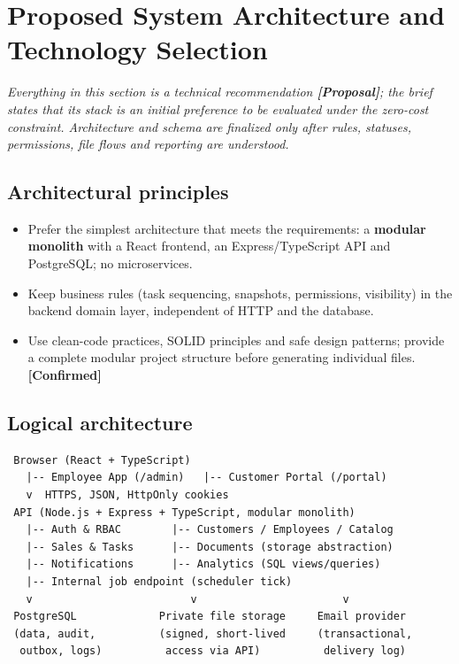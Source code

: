 \documentclass[11pt,a4paper]{article}
\newcommand{\tagconf}{\textcolor{green!45!black}{\textbf{[Confirmed]}}}
\newcommand{\tagprop}{\textcolor{orange!80!black}{\textbf{[Proposal]}}}
\begin{document}
\section{Proposed System Architecture and Technology Selection}

\emph{Everything in this section is a technical recommendation \tagprop{}; the
	brief states that its stack is an initial preference to be evaluated under the
	zero-cost constraint. Architecture and schema are finalized only after rules,
	statuses, permissions, file flows and reporting are understood.}

\subsection{Architectural principles}

\begin{itemize}
	\item Prefer the simplest architecture that meets the requirements: a
	      \textbf{modular monolith} with a React frontend, an Express/TypeScript API and
	      PostgreSQL; no microservices.
	\item Keep business rules (task sequencing, snapshots, permissions,
	      visibility) in the backend domain layer, independent of HTTP and the database.
	\item Use clean-code practices, SOLID principles and safe design patterns;
	      provide a complete modular project structure before generating individual files.
	      \tagconf{}
\end{itemize}

\subsection{Logical architecture}

\begin{verbatim}
 Browser (React + TypeScript)
   |-- Employee App (/admin)   |-- Customer Portal (/portal)
   v  HTTPS, JSON, HttpOnly cookies
 API (Node.js + Express + TypeScript, modular monolith)
   |-- Auth & RBAC        |-- Customers / Employees / Catalog
   |-- Sales & Tasks      |-- Documents (storage abstraction)
   |-- Notifications      |-- Analytics (SQL views/queries)
   |-- Internal job endpoint (scheduler tick)
   v                         v                       v
 PostgreSQL             Private file storage     Email provider
 (data, audit,          (signed, short-lived     (transactional,
  outbox, logs)          access via API)          delivery log)
\end{verbatim}
\end{document}
